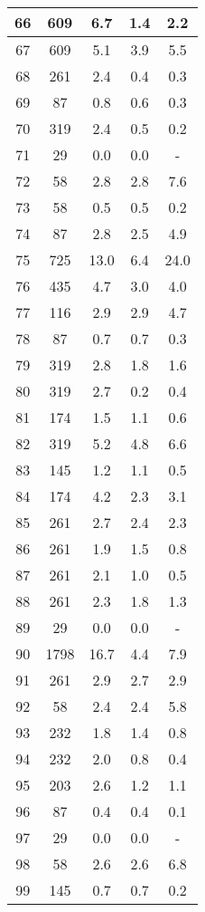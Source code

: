 \documentclass[a4paper,10pt]{article}
\begin{document}
\begin{table}
\begin{tabular}{|c|c|c|c|c|}
66 & 609 & 6.7 & 1.4 & 2.2 \\
\hline
67 & 609 & 5.1 & 3.9 & 5.5 \\
\hline
68 & 261 & 2.4 & 0.4 & 0.3 \\
\hline
69 & 87 & 0.8 & 0.6 & 0.3 \\
\hline
70 & 319 & 2.4 & 0.5 & 0.2 \\
\hline
71 & 29 & 0.0 & 0.0 & - \\
\hline
72 & 58 & 2.8 & 2.8 & 7.6 \\
\hline
73 & 58 & 0.5 & 0.5 & 0.2 \\
\hline
74 & 87 & 2.8 & 2.5 & 4.9 \\
\hline
75 & 725 & 13.0 & 6.4 & 24.0 \\
\hline
76 & 435 & 4.7 & 3.0 & 4.0 \\
\hline
77 & 116 & 2.9 & 2.9 & 4.7 \\
\hline
78 & 87 & 0.7 & 0.7 & 0.3 \\
\hline
79 & 319 & 2.8 & 1.8 & 1.6 \\
\hline
80 & 319 & 2.7 & 0.2 & 0.4 \\
\hline
81 & 174 & 1.5 & 1.1 & 0.6 \\
\hline
82 & 319 & 5.2 & 4.8 & 6.6 \\
\hline
83 & 145 & 1.2 & 1.1 & 0.5 \\
\hline
84 & 174 & 4.2 & 2.3 & 3.1 \\
\hline
85 & 261 & 2.7 & 2.4 & 2.3 \\
\hline
86 & 261 & 1.9 & 1.5 & 0.8 \\
\hline
87 & 261 & 2.1 & 1.0 & 0.5 \\
\hline
88 & 261 & 2.3 & 1.8 & 1.3 \\
\hline
89 & 29 & 0.0 & 0.0 & - \\
\hline
90 & 1798 & 16.7 & 4.4 & 7.9 \\
\hline
91 & 261 & 2.9 & 2.7 & 2.9 \\
\hline
92 & 58 & 2.4 & 2.4 & 5.8 \\
\hline
93 & 232 & 1.8 & 1.4 & 0.8 \\
\hline
94 & 232 & 2.0 & 0.8 & 0.4 \\
\hline
95 & 203 & 2.6 & 1.2 & 1.1 \\
\hline
96 & 87 & 0.4 & 0.4 & 0.1 \\
\hline
97 & 29 & 0.0 & 0.0 & - \\
\hline
98 & 58 & 2.6 & 2.6 & 6.8 \\
\hline
99 & 145 & 0.7 & 0.7 & 0.2 \\
\hline

\end{tabular}
\end{table}
\end{document}
